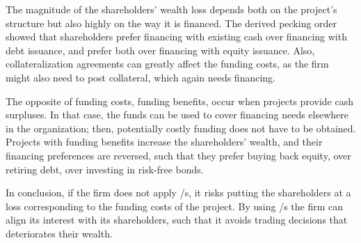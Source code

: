 \documentclass[main.tex]{subfiles}
\begin{document}
    The magnitude of the shareholders' wealth loss depends both on the project's structure
    but also highly on the way it is financed. 
    The derived pecking order showed that shareholders prefer 
    financing with existing cash over financing with debt issuance, 
    and prefer both over financing with equity issuance.
    Also, collateralization agreements can greatly affect the funding costs,
    as the firm might also need to post collateral, which again needs financing.

    The opposite of funding costs, funding benefits, occur when projects provide cash surpluses.
    In that case, the funds can be used to cover financing needs elsewhere in the organization;
    then, potentially costly funding does not have to be obtained.
    \\
    Projects with funding benefits increase the shareholders' wealth,
    and their financing preferences are reversed, 
    such that they prefer buying back equity, over retiring debt, over investing in risk-free bonds.

    In conclusion, if the firm does not apply \FVA/s, it risks putting the shareholders at a loss
    corresponding to the funding costs of the project.
    By using \FVA/s the firm can align its interest with its shareholders,
    such that it avoids trading decisions that deteriorates their wealth. 
\end{document}
